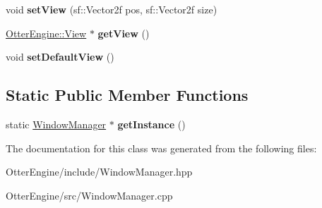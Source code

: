 \begin{DoxyCompactItemize}
\item 
void {\bfseries set\+View} (sf\+::\+Vector2f pos, sf\+::\+Vector2f size)\hypertarget{class_window_manager_a2e2445bfd7e8a4e9e4858ae84897a01d}{}\label{class_window_manager_a2e2445bfd7e8a4e9e4858ae84897a01d}

\item 
\hyperlink{class_otter_engine_1_1_view}{Otter\+Engine\+::\+View} $\ast$ {\bfseries get\+View} ()\hypertarget{class_window_manager_a6aaa5a7360d584ccf029e17bfcc36416}{}\label{class_window_manager_a6aaa5a7360d584ccf029e17bfcc36416}

\item 
void {\bfseries set\+Default\+View} ()\hypertarget{class_window_manager_a3c5458086022d0a611916d92808f756e}{}\label{class_window_manager_a3c5458086022d0a611916d92808f756e}

\end{DoxyCompactItemize}
\subsection*{Static Public Member Functions}
\begin{DoxyCompactItemize}
\item 
static \hyperlink{class_window_manager}{Window\+Manager} $\ast$ {\bfseries get\+Instance} ()\hypertarget{class_window_manager_ad355c4e87c81d54ff6d1ab56ca8f42c4}{}\label{class_window_manager_ad355c4e87c81d54ff6d1ab56ca8f42c4}

\end{DoxyCompactItemize}


The documentation for this class was generated from the following files\+:\begin{DoxyCompactItemize}
\item 
Otter\+Engine/include/Window\+Manager.\+hpp\item 
Otter\+Engine/src/Window\+Manager.\+cpp\end{DoxyCompactItemize}
